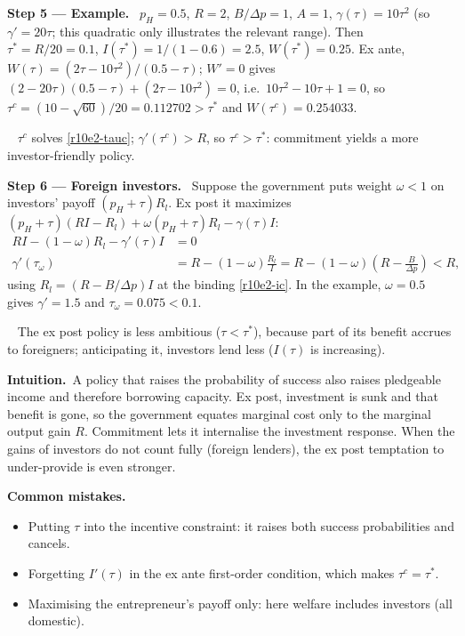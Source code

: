 \documentclass[11pt,a4paper]{article}
\newcommand{\step}[2]{\par\medskip\noindent\textbf{Step #1 --- #2.}~}
\newcommand{\intuition}{\par\medskip\noindent\textbf{Intuition.}~}
\newcommand{\answer}[1]{\par\smallskip\noindent\fbox{\textbf{Answer\if\relax\detokenize{#1}\relax\else\ #1\fi.}}~}
\newcommand{\pitfalls}{\par\medskip\noindent\textbf{Common mistakes.}}
\begin{document}
\step{5}{Example} $p_H=0.5$, $R=2$, $B/\Delta p=1$, $A=1$, $\gamma(\tau)=10\tau^2$ (so $\gamma'=20\tau$; this quadratic only illustrates the relevant range). Then $\tau^*=R/20=0.1$, $I(\tau^*)=1/(1-0.6)=2.5$, $W(\tau^*)=0.25$. Ex ante, $W(\tau)=(2\tau-10\tau^2)/(0.5-\tau)$; $W'=0$ gives $(2-20\tau)(0.5-\tau)+(2\tau-10\tau^2)=0$, i.e.\ $10\tau^2-10\tau+1=0$, so $\tau^c=(10-\sqrt{60})/20=0.112702>\tau^*$ and $W(\tau^c)=0.254033$.

\answer{(ii)} $\tau^c$ solves \eqref{r10e2-tauc}; $\gamma'(\tau^c)>R$, so $\tau^c>\tau^*$: commitment yields a more investor-friendly policy.

\step{6}{Foreign investors} Suppose the government puts weight $\omega<1$ on investors' payoff $(p_H+\tau)R_l$. Ex post it maximizes $(p_H+\tau)(RI-R_l)+\omega(p_H+\tau)R_l-\gamma(\tau)I$:
\begin{align}
  RI-(1-\omega)R_l-\gamma'(\tau)I &= 0 \nonumber\\
  \gamma'(\tau_\omega) &= R-(1-\omega)\frac{R_l}{I} = R-(1-\omega)\left(R-\frac{B}{\Delta p}\right)<R, \label{r10e2-omega}
\end{align}
using $R_l=(R-B/\Delta p)I$ at the binding \eqref{r10e2-ic}. In the example, $\omega=0.5$ gives $\gamma'=1.5$ and $\tau_\omega=0.075<0.1$.

\answer{(iii)} The ex post policy is less ambitious ($\tau<\tau^*$), because part of its benefit accrues to foreigners; anticipating it, investors lend less ($I(\tau)$ is increasing).

\intuition A policy that raises the probability of success also raises pledgeable income and therefore borrowing capacity. Ex post, investment is sunk and that benefit is gone, so the government equates marginal cost only to the marginal output gain $R$. Commitment lets it internalise the investment response. When the gains of investors do not count fully (foreign lenders), the ex post temptation to under-provide is even stronger.

\pitfalls
\begin{itemize}
  \item Putting $\tau$ into the incentive constraint: it raises both success probabilities and cancels.
  \item Forgetting $I'(\tau)$ in the ex ante first-order condition, which makes $\tau^c=\tau^*$.
  \item Maximising the entrepreneur's payoff only: here welfare includes investors (all domestic).
\end{itemize}
\end{document}
